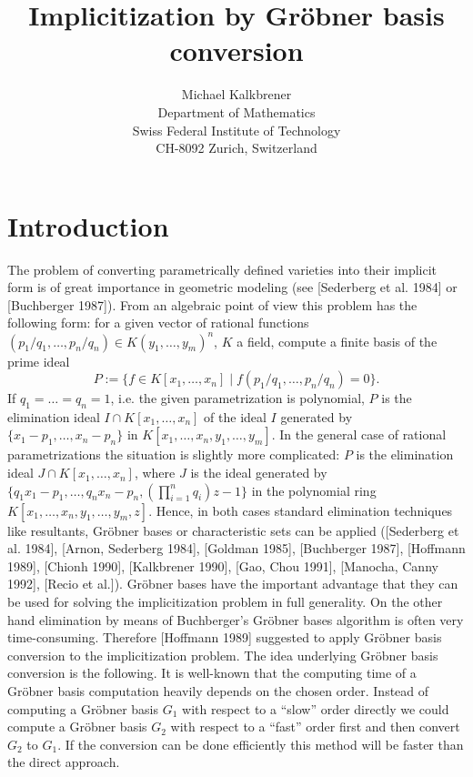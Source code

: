 \title{Implicitization by Gr\"obner basis conversion}
\author{Michael Kalkbrener\\Department of Mathematics\\
Swiss Federal Institute of 
Technology\\
CH-8092 Zurich, Switzerland}

\textheight     620pt
\textwidth      420pt
\topmargin       18pt
\oddsidemargin   30pt
\evensidemargin  30pt

\date{} 
\newtheorem{theorem}{Theorem}
\newtheorem{example}{Example}
\newtheorem{lemma}{Lemma}
\newtheorem{corollary}{Corollary}
\newtheorem{definition}{Definition}


\maketitle


\section{Introduction}

The problem of converting parametrically defined varieties into 
their implicit form is of great importance in geometric modeling 
(see [Sederberg et al. 1984]
or [Buchberger 1987]). From an algebraic point of view this problem has the 
following form:
for a given vector of rational functions 
$(p_1/q_1,\ldots,p_n/q_n)\in K(y_1,\ldots,y_m)^n$, $K$
a field, compute a finite basis of the prime ideal 
\[ P:=\{f\in K[x_1,\ldots,x_n]\mid f(p_1/q_1,\ldots,p_n/q_n)=0\}. \]
If $q_1=\ldots =q_n=1$, i.e. the given parametrization is polynomial,
$P$ is the elimination ideal $I\cap K[x_1,\ldots,x_n]$ of the ideal $I$ 
generated by $\{x_1-p_1,\ldots,x_n-p_n\}$ in 
$K[x_1,\ldots,x_n,y_1,\ldots,y_m]$. In the general case of rational
parametrizations the situation is slightly more complicated: $P$
is the elimination ideal $J\cap K[x_1,\ldots,x_n]$, where $J$ is the
ideal generated by $\{q_1x_1-p_1,\ldots,q_nx_n-p_n,(\prod_{i=1}^n q_i)z-1\}$ 
in the polynomial ring $K[x_1,\ldots,x_n,y_1,\ldots,y_m,z]$. Hence,
in both cases standard elimination
techniques like resultants, Gr\"obner bases or characteristic sets
can be applied
([Sederberg et al. 1984], [Arnon, Sederberg 1984],
[Goldman 1985], [Buchberger 1987], [Hoffmann 1989],
[Chionh 1990], [Kalkbrener 1990], [Gao, Chou 1991], [Manocha, Canny 1992],
[Recio et al.]).
Gr\"obner bases have the important 
advantage that
they can be used for solving the implicitization problem in full 
generality. On the other hand elimination by means of Buchberger's 
Gr\"obner bases algorithm is often very time-consuming.
Therefore [Hoffmann 1989] suggested to apply Gr\"obner basis
conversion to the implicitization problem. The idea underlying Gr\"obner basis
conversion is the following. It is well-known that the computing
time of a Gr\"obner basis computation 
heavily depends on the chosen order. Instead of computing 
a Gr\"obner basis $G_1$
with respect to a ``slow'' order directly
we could compute a Gr\"obner basis $G_2$
with respect to a ``fast'' order first and then convert $G_2$ to $G_1$.
If the conversion can be done efficiently this method will be faster than
the direct approach.

